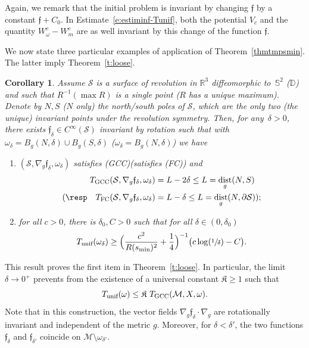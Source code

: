\documentclass[JEP,XML,SOM,Unicode]{cedram}
\newcommand{\FC}{\textup{FC}}
\newcommand{\pFC}{\textup{(FC)}\xspace}
\newcommand{\GCC}{\textup{GCC}}
\newcommand{\pGCC}{\textup{(GCC)}\xspace}
\newcommand{\unif}{\textup{unif}}
\newtheorem{corollary}[lemma]{Corollary}
\theoremstyle{definition}
\newcommand{\M}{\ensuremath{\mathcal M}}
\newcommand{\calS}{\ensuremath{\mathcal S}}
\newcommand{\mb}[1]{\ensuremath{\mathbb{#1}}}
\newcommand{\ID}{\ensuremath{\mathbb D}}
\newcommand{\R}{{\mb{R}}}
\newcommand{\bS}{\ensuremath{\mathbb S}}
\newcommand{\f}{\ensuremath{\mathfrak{f}}}
\DeclareMathOperator{\dist}{dist}
\newcommand{\ce}{c}
\let\d\partial
\let\de\delta
\begin{document}
Again, we remark that the initial problem is invariant by changing $\f$ by a constant $\f+C_0$. In Estimate~\eqref{e:estiminf-Tunif}, both the potential $V_{c}$ and the quantity $W_{\omega}^{\ce}-W_{m}^{\ce}$ are as well invariant by this change of the function $\f$.

We now state three particular examples of application of Theorem~\ref{thmtmpsmin}.
The latter imply Theorem~\ref{t:loose}.

\begin{corollary}
\label{c:sphere-disk}
Assume $\calS$ is a surface of revolution in $\R^3$ diffeomorphic to~$\bS^2$ (\resp $\ID$) and such that $R^{-1}(\max R)$ is a single point ($R$ has a unique maximum). Denote by $N,S$ (\resp $N$ only) the north/south poles of $\calS$, which are the only two (\resp the unique) invariant points under the revolution symmetry.
Then, for any~\hbox{$\delta>0$}, there exists $\f_\delta \in C^\infty(\calS)$ invariant by rotation such that
with $\omega_\delta = B_g(N, \delta) \cup B_g(S, \delta)$ (\resp $\omega_\delta = B_g(N, \delta)$) we have
\begin{enumerate}
\item $(\calS,\nabla_g\f_\de,\omega_\delta)$ satisfies \pGCC (\resp satisfies \pFC) and\vspace*{-3pt}
\begin{align*}
T_{\GCC}(\calS,\nabla_g\f_\de,\omega_\delta) &= L-2\delta \leq L= \dist_g(N,S)\\
(\resp \quad T_{\FC}(\calS,\nabla_g\f_\de,\omega_\delta) &= L-\delta \leq L= \dist_g(N,\d\calS));
\end{align*}
\item for all $\ce>0$, there is $\delta_0,C >0$ such that for all $\delta \in (0,\delta_0)$\vspace*{-3pt}
\[
T_{\unif}(\omega_\delta) \geq \Bigl( \frac{\ce^2}{R(s_{\min})^2} + \frac14 \Bigr)^{-1} \bigl( \ce \log(\sfrac1{\delta}) - C \bigr).
\]
\end{enumerate}
\end{corollary}
This result proves the first item in Theorem~\ref{t:loose}.
In particular, the limit \hbox{$\delta\to 0^+$} prevents from the existence of a universal constant $\mathfrak{K}\geq 1$ such that\vspace*{-3pt}
\[
T_{\unif}(\omega) \leq \mathfrak{K} \ T_{\GCC}(\M,X,\omega).
\]
Note that in this construction, the vector fields $\nabla_g\f_\de \cdot \nabla_g$ are rotationally invariant and independent of the metric $g$. Moreover, for $\delta < \delta'$, the two functions $\f_\de$ and $\f_{\de'}$ coincide on $\M\setminus \omega_{\delta'}$.
\end{document}
